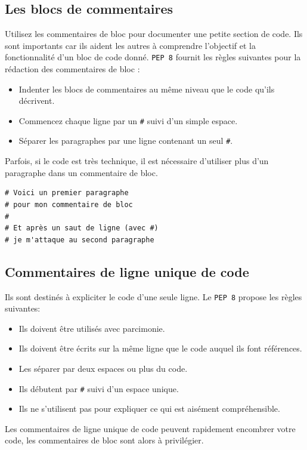\documentclass[a4paper,11pt]{book}
\begin{document}
\subsection*{Les blocs de commentaires}
Utilisez les commentaires de bloc pour documenter une petite section de code. Ils sont importants car ils aident les autres à comprendre l'objectif et la fonctionnalité d'un bloc de code donné. \texttt{PEP 8} fournit les règles suivantes pour la rédaction des commentaires de bloc :
\begin{itemize}
	\item Indenter les blocs de commentaires au même niveau que le code qu'ils décrivent.
    \item Commencez chaque ligne par un \texttt{\#} suivi d'un simple espace.
    \item Séparer les paragraphes par une ligne contenant un seul \texttt{\#}.
\end{itemize}
\medskip

Parfois, si le code est très technique, il est nécessaire d'utiliser plus d'un paragraphe dans un commentaire de bloc.
\begin{lstlisting}
# Voici un premier paragraphe
# pour mon commentaire de bloc
#
# Et après un saut de ligne (avec #)
# je m'attaque au second paragraphe
\end{lstlisting}
\medskip

\subsection*{Commentaires de ligne unique de code}
Ils sont destinés à expliciter le code d'une seule ligne. Le \texttt{PEP 8} propose les règles suivantes:
\begin{itemize}
	\item Ils doivent être utilisés avec parcimonie.
	\item Ils doivent être écrits sur la même ligne que le code auquel ils font références.
	\item Les séparer par deux espaces ou plus du code.
	\item Ils débutent par \texttt{\#} suivi d'un espace unique.
	\item Ils ne s'utilisent pas pour expliquer ce qui est aisément compréhensible. 
\end{itemize} 
\medskip

Les commentaires de ligne unique de code peuvent rapidement encombrer votre code, les commentaires de bloc sont alors à privilégier.
\medskip
\end{document}
